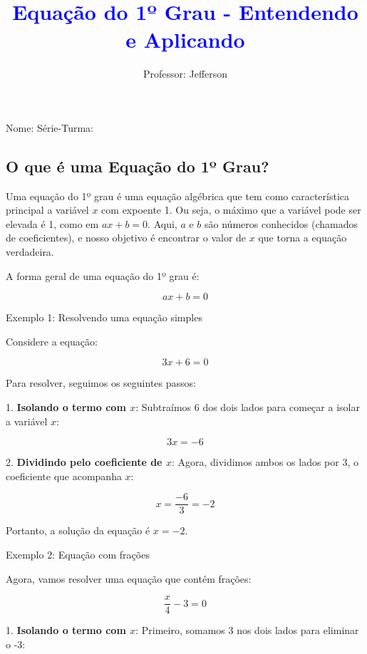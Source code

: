 \documentclass[11pt]{article}
\title{\textcolor{blue}{Equação do 1º Grau - Entendendo e Aplicando}}
\author{Professor: Jefferson}
\date{}
\begin{document}
\maketitle
\vspace{-1cm}  %

\begin{center}
\large{Nome: \underline{\hspace{8cm}} \quad Série-Turma: \underline{\hspace{3cm}}}
\end{center}

\begin{multicols}{2}

\section*{O que é uma Equação do 1º Grau?}

Uma equação do 1º grau é uma equação algébrica que tem como característica principal a variável \( x \) com expoente 1. Ou seja, o máximo que a variável pode ser elevada é 1, como em \( ax + b = 0 \). Aqui, \( a \) e \( b \) são números conhecidos (chamados de coeficientes), e nosso objetivo é encontrar o valor de \( x \) que torna a equação verdadeira.

A forma geral de uma equação do 1º grau é:

\[
ax + b = 0
\]

Exemplo 1: Resolvendo uma equação simples

Considere a equação:

\[
3x + 6 = 0
\]

Para resolver, seguimos os seguintes passos:

1. \textbf{Isolando o termo com \(x\)}: Subtraímos 6 dos dois lados para começar a isolar a variável \(x\):

\[
3x = -6
\]

2. \textbf{Dividindo pelo coeficiente de \(x\)}: Agora, dividimos ambos os lados por 3, o coeficiente que acompanha \(x\):

\[
x = \frac{-6}{3} = -2
\]

Portanto, a solução da equação é \(x = -2\).

Exemplo 2: Equação com frações

Agora, vamos resolver uma equação que contém frações:

\[
\frac{x}{4} - 3 = 0
\]

1. \textbf{Isolando o termo com \(x\)}: Primeiro, somamos 3 nos dois lados para eliminar o -3:


\end{multicols}
\end{document}
